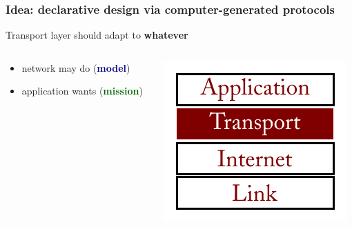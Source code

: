 \documentclass[svgnames]{beamer}
\begin{document}
\begin{frame}
\frametitle{Idea: declarative design via computer-generated protocols}

\Large Transport layer should adapt to \textbf{whatever}

\begin{columns}

\begin{column}{0.66 \textwidth}

\begin{itemize}
\item network may do (\textbf{\textcolor{DarkBlue}{model}})

\item application wants (\textbf{\textcolor{DarkGreen}{mission}})

\end{itemize}

\end{column}

\begin{column}{0.33\textwidth}

\includegraphics[width=\textwidth]{transport.pdf}

\end{column}

\end{columns}

\end{frame}
\end{document}
